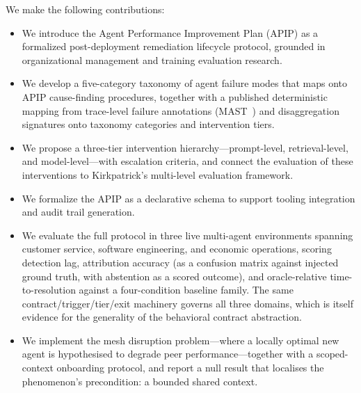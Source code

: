 We make the following contributions:
\begin{itemize}
  \item We introduce the Agent Performance Improvement Plan (APIP) as a
        formalized post-deployment remediation lifecycle protocol, grounded in
        organizational management and training evaluation research.
  \item We develop a five-category taxonomy of agent failure modes that maps
        onto APIP cause-finding procedures, together with a published
        deterministic mapping from trace-level failure annotations
        (MAST~\cite{cemri2025mast}) and disaggregation signatures onto taxonomy
        categories and intervention tiers.
  \item We propose a three-tier intervention hierarchy---prompt-level,
        retrieval-level, and model-level---with escalation criteria, and connect
        the evaluation of these interventions to Kirkpatrick's multi-level
        evaluation framework.
  \item We formalize the APIP as a declarative schema to support tooling
        integration and audit trail generation.
  \item We evaluate the full protocol in three live multi-agent environments
        spanning customer service, software engineering, and economic
        operations, scoring detection lag, attribution accuracy (as a confusion
        matrix against injected ground truth, with abstention as a scored
        outcome), and oracle-relative time-to-resolution against a four-condition
        baseline family. The same contract/trigger/tier/exit machinery governs
        all three domains, which is itself evidence for the generality of the
        behavioral contract abstraction.
  \item We implement the mesh disruption problem---where a locally optimal new
        agent is hypothesised to degrade peer performance---together with a
        scoped-context onboarding protocol, and report a null result that
        localises the phenomenon's precondition: a bounded shared context.
\end{itemize}
